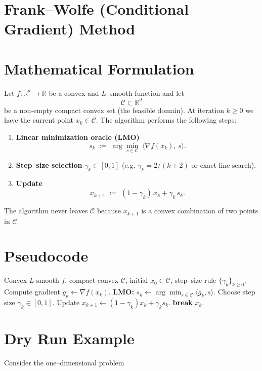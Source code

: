 \documentclass[11pt]{article}
\newcommand{\R}{\mathbb{R}}
\newcommand{\Cset}{\mathcal{C}}
\begin{document}
\section*{Frank–Wolfe (Conditional Gradient) Method}

\section*{Mathematical Formulation}
Let $f:\R^{d}\rightarrow\R$ be a convex and $L$–smooth function and let 
\[
\Cset\subset\R^{d}
\]
be a non‑empty compact convex set (the feasible domain).  
At iteration $k\ge 0$ we have the current point $x_{k}\in\Cset$.  
The algorithm performs the following steps:

\begin{enumerate}[label=\arabic*)]
\item \textbf{Linear minimization oracle (LMO)}  
\[
s_{k}\;:=\;\arg\min_{s\in\Cset}\;\langle \nabla f(x_{k}),\,s\rangle .
\tag{1}
\]
\item \textbf{Step–size selection} $\gamma_{k}\in[0,1]$ (e.g. $\gamma_{k}=2/(k+2)$ or exact line search).  
\item \textbf{Update}  
\[
x_{k+1}\;:=\;(1-\gamma_{k})\,x_{k}+\gamma_{k}\,s_{k}.
\tag{2}
\]
\end{enumerate}

The algorithm never leaves $\Cset$ because $x_{k+1}$ is a convex combination of two points in $\Cset$.

\section*{Pseudocode}
\begin{algorithm}[H]
\caption{Frank–Wolfe (Conditional Gradient)}\label{alg:FW}
\begin{algorithmic}[1]
\Require Convex $L$‑smooth $f$, compact convex $\Cset$, initial $x_{0}\in\Cset$, 
step–size rule $\{\gamma_{k}\}_{k\ge0}$.
    \State Compute gradient $g_{k}\gets\nabla f(x_{k})$.
    \State \textbf{LMO:} $s_{k}\gets\arg\min_{s\in\Cset}\langle g_{k},s\rangle$.
    \State Choose step size $\gamma_{k}\in[0,1]$.
    \State Update $x_{k+1}\gets (1-\gamma_{k})x_{k}+\gamma_{k}s_{k}$.
        \State \textbf{break}
    \EndIf
\EndFor
\State \Return $x_{k}$.
\end{algorithmic}
\end{algorithm}

\section*{Dry Run Example}
Consider the one–dimensional problem  
\end{document}
